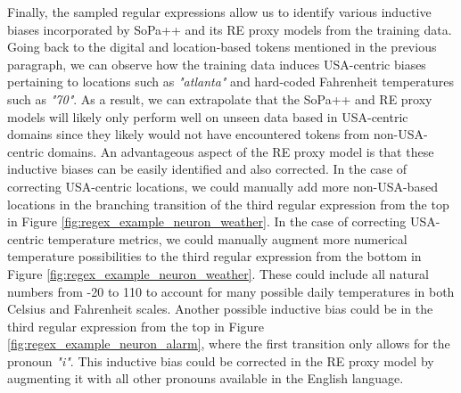 Finally, the sampled regular expressions allow us to identify various inductive
biases incorporated by SoPa++ and its RE proxy models from the training data.
Going back to the digital and location-based tokens mentioned in the previous
paragraph, we can observe how the training data induces USA-centric biases
pertaining to locations such as \textit{"atlanta"} and hard-coded Fahrenheit
temperatures such as \textit{"70"}. As a result, we can extrapolate that the
SoPa++ and RE proxy models will likely only perform well on unseen data based in
USA-centric domains since they likely would not have encountered tokens from
non-USA-centric domains. An advantageous aspect of the RE proxy model is that
these inductive biases can be easily identified and also corrected. In the case
of correcting USA-centric locations, we could manually add more non-USA-based
locations in the branching transition of the third regular expression from the
top in Figure \ref{fig:regex_example_neuron_weather}. In the case of correcting
USA-centric temperature metrics, we could manually augment more numerical
temperature possibilities to the third regular expression from the bottom in
Figure \ref{fig:regex_example_neuron_weather}. These could include all natural
numbers from -20 to 110 to account for many possible daily temperatures in both
Celsius and Fahrenheit scales. Another possible inductive bias could be in the
third regular expression from the top in Figure
\ref{fig:regex_example_neuron_alarm}, where the first transition only allows for
the pronoun \textit{"i"}. This inductive bias could be corrected in the RE proxy
model by augmenting it with all other pronouns available in the English
language.


